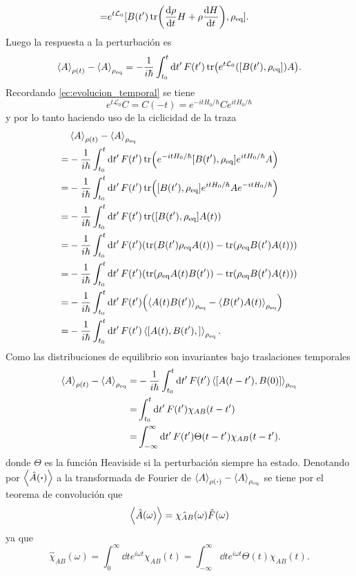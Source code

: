 \documentclass{article}
\begin{document}
\begin{enumerate}
\begin{align}
\begin{split}
=&e^{t\mathcal{L}_0}[B(t')\tr(\dv{\rho}{t}H+\rho\dv{H}{t}),\rho_{\text{eq}}].
\end{split}
\end{align}
Luego la respuesta a la perturbación es 
\begin{equation}
\ev{A}_{\rho(t)}-\ev{A}_{\rho_\text{eq}}=-\frac{1}{i\hbar}\int_{t_0}^t\dd{t'}F(t')\tr(e^{t\mathcal{L}_0}([B(t'),\rho_{\text{eq}}])A).
\end{equation}
Recordando \eqref{ec:evolucion_temporal} se tiene
\begin{equation}
e^{t\mathcal{L}_0}C=C(-t)=e^{-itH_0/\hbar}Ce^{itH_0/\hbar}
\end{equation}
y por lo tanto haciendo uso de la ciclicidad de la traza
\begin{align}
\begin{split}
&\ev{A}_{\rho(t)}-\ev{A}_{\rho_\text{eq}}\\
=&-\frac{1}{i\hbar}\int_{t_0}^t\dd{t'}F(t')\tr(e^{-itH_0/\hbar}[B(t'),\rho_{\text{eq}}]e^{itH_0/\hbar}A)\\
=&-\frac{1}{i\hbar}\int_{t_0}^t\dd{t'}F(t')\tr([B(t'),\rho_{\text{eq}}]e^{itH_0/\hbar}Ae^{-itH_0/\hbar})\\
=&-\frac{1}{i\hbar}\int_{t_0}^t\dd{t'}F(t')\tr([B(t'),\rho_{\text{eq}}]A(t))\\
=&-\frac{1}{i\hbar}\int_{t_0}^t\dd{t'}F(t')\qty(\tr(B(t')\rho_{\text{eq}}A(t))-\tr(\rho_{\text{eq}}B(t')A(t)))\\
=&-\frac{1}{i\hbar}\int_{t_0}^t\dd{t'}F(t')\qty(\tr(\rho_{\text{eq}}A(t)B(t'))-\tr(\rho_{\text{eq}}B(t')A(t)))\\
=&-\frac{1}{i\hbar}\int_{t_0}^t\dd{t'}F(t')\qty(\ev{A(t)B(t')}_{\rho_{\text{eq}}}-\ev{B(t')A(t)}_{\rho_{\text{eq}}})\\
=&-\frac{1}{i\hbar}\int_{t_0}^t\dd{t'}F(t')\ev{[A(t),B(t'),]}_{\rho_{\text{eq}}}.
\end{split}
\end{align}
Como las distribuciones de equilibrio son invariantes bajo traslaciones temporales
\begin{align}\label{ec:valores_esperados}
\begin{split}
\ev{A}_{\rho(t)}-\ev{A}_{\rho_\text{eq}}=&-\frac{1}{i\hbar}\int_{t_0}^t\dd{t'}F(t')\ev{[A(t-t'),B(0)]}_{\rho_{\text{eq}}}\\
=&\int_{t_0}^t\dd{t'}F(t')\chi_{AB}(t-t')\\
=&\int_{-\infty}^\infty\dd{t'}F(t')\Theta(t-t')\chi_{AB}(t-t').
\end{split}
\end{align}
donde $\Theta$ es la función Heaviside si la perturbación siempre ha estado. Denotando por $\ev{\hat{A}(\vdot)}$ a la transformada de Fourier de $\ev{A}_{\rho(\vdot)}-\ev{A}_{\rho_\text{eq}}$ se tiene por el teorema de convolución que
\begin{equation}
\ev{\hat{A}(\omega)}=\hat{\chi_{AB}}(\omega)\hat{F}(\omega)
\end{equation}
ya que
\begin{equation}
\hat{\chi}_{AB}(\omega)=\int_0^\infty\dd{t}e^{i\omega t}\chi_{AB}(t)=\int_{-\infty}^\infty\dd{t}e^{i\omega t}\Theta(t)\chi_{AB}(t).
\end{equation}


\end{enumerate}
\end{document}
